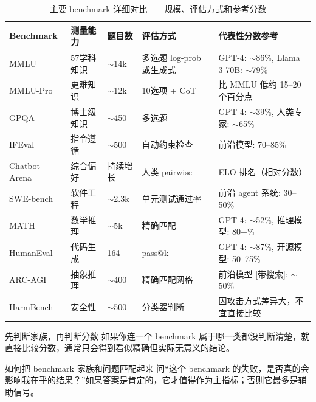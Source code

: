 \begin{table}[H]
\centering
\small
\begin{tabular}{p{2.2cm}p{2.0cm}p{1.5cm}p{2.5cm}p{4.5cm}}
\toprule
\textbf{Benchmark} & \textbf{测量能力} & \textbf{题目数} & \textbf{评估方式} & \textbf{代表性分数参考} \\
\midrule
MMLU & 57学科知识 & $\sim$14k & 多选题 log-prob 或生成式 & GPT-4: $\sim$86\%, Llama 3 70B: $\sim$79\% \\
\midrule
MMLU-Pro & 更难知识 & $\sim$12k & 10选项 + CoT & 比 MMLU 低约 15--20 个百分点 \\
\midrule
GPQA & 博士级知识 & $\sim$450 & 多选题 & GPT-4: $\sim$39\%, 人类专家: $\sim$65\% \\
\midrule
IFEval & 指令遵循 & $\sim$500 & 自动约束检查 & 前沿模型: 70--85\% \\
\midrule
Chatbot Arena & 综合偏好 & 持续增长 & 人类 pairwise & ELO 排名（相对分数） \\
\midrule
SWE-bench & 软件工程 & $\sim$2.3k & 单元测试通过率 & 前沿 agent 系统: 30--50\% \\
\midrule
MATH & 数学推理 & $\sim$5k & 精确匹配 & GPT-4: $\sim$52\%, 推理模型: 80+\% \\
\midrule
HumanEval & 代码生成 & 164 & pass@k & GPT-4: $\sim$87\%, 开源模型: 50--75\% \\
\midrule
ARC-AGI & 抽象推理 & $\sim$400 & 精确匹配网格 & 前沿模型 {[}带搜索{]}: $\sim$50\% \\
\midrule
HarmBench & 安全性 & $\sim$500 & 分类器判断 & 因攻击方式差异大，不宜直接比较 \\
\bottomrule
\end{tabular}
\caption{主要 benchmark 详细对比——规模、评估方式和参考分数}
\end{table}

\begin{importantbox}{先判断家族，再判断分数}
如果你连一个 benchmark 属于哪一类都没判断清楚，就直接比较分数，通常只会得到看似精确但实际无意义的结论。
\end{importantbox}

\begin{knowledgebox}{如何把 benchmark 家族和问题匹配起来}
问“这个 benchmark 的失败，是否真的会影响我在乎的结果？”如果答案是肯定的，它才值得作为主指标；否则它最多是辅助信号。
\end{knowledgebox}

